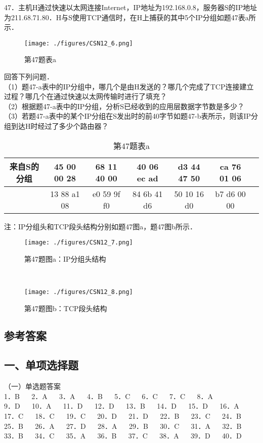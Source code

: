 47．主机H通过快速以太网连接Internet，IP地址为192.168.0.8，服务器S的IP地址为211.68.71.80．H与S使用TCP通信时，在H上捕获的其中5个IP分组如题47表a所示．
\begin{figure}[ht]
\centering
\texttt{[image: ./figures/CSN12\_6.png]}
\caption{第47题表a} \label{CSN12_fig6}
\end{figure}
回答下列问题．\\
（1）题47-a表中的IP分组中，哪几个是由H发送的？哪几个完成了TCP连接建立过程？哪几个在通过快速以太网传输时进行了填充？\\
（2）根据题47-a表中的IP分组，分析S已经收到的应用层数据字节数是多少？\\
（3）若题47-a表中的某个IP分组在S发出时的前40字节如题47-b表所示，则该IP分组到达H时经过了多少个路由器？\\
\begin{table}[ht]
\centering
\caption{第47题表a}\label{CSN12_tab3}
\begin{tabular}{|c|c|c|c|c|c|c|}
\hline
来自S的分组 & 45 00 00 28 & 68 11 40 00 & 40 06 ec ad & d3 44 47 50 & ca 76 01 06 &  \\
\hline
 & 13 88 a1 08 & e0 59 9f f0 & 84 6b 41 d6 & 50 10 16 d0 & b7 d6 00 00 &  \\
\hline
\end{tabular}
\end{table}
注：IP分组头和TCP段头结构分别如题47图a，题47图b所示．\\
\begin{figure}[ht]
\centering
\texttt{[image: ./figures/CSN12\_7.png]}
\caption{第47题图a：IP分组头结构} \label{CSN12_fig7}
\end{figure}\\
\begin{figure}[ht]
\centering
\texttt{[image: ./figures/CSN12\_8.png]}
\caption{第47题图b：TCP段头结构} \label{CSN12_fig8}
\end{figure}

\subsection{参考答案}
\subsection{一、单项选择题}
（一）单选题答案 \\
1．B $\quad$ 2．A $\quad$ 3．A $\quad$ 4．B $\quad$ 5．C $\quad$ 6．C $\quad$ 7．C $\quad$ 8．A \\
9．D $\quad$ 10．A $\quad$ 11．D $\quad$ 12．D $\quad$ 13．B $\quad$ 14．D $\quad$ 15．D $\quad$ 16．A $\quad$ \\
17．C $\quad$ 18．C $\quad$ 19．C $\quad$ 20．D $\quad$ 21．D $\quad$ 22．B $\quad$ 23．C $\quad$ 24．B \\
25．B $\quad$ 26．A $\quad$ 27．D $\quad$ 28．A $\quad$ 29．B  $\quad$ 30．C $\quad$ 31．A $\quad$ 32．B \\
33．B $\quad$ 34．C $\quad$ 35．A $\quad$ 36．B $\quad$ 37．C $\quad$ 38．A $\quad$ 39．D $\quad$ 40．D

